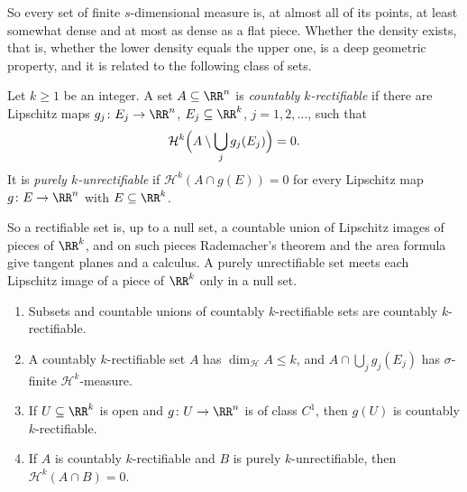 So every set of finite $s$-dimensional measure is, at almost all of its points, at least somewhat dense and at most as dense as a flat piece. Whether the density exists, that is, whether the lower
density equals the upper one, is a deep geometric property, and it is related to the following class of sets.

\begin{definition}\label{geometric-measure-theory:definition-rectifiable}
Let $k \geq 1$ be an integer. A set $A \subseteq \RR^n$ is \emph{countably $k$-rectifiable} if there are Lipschitz maps $g_j \colon E_j \to \RR^n$, $E_j \subseteq \RR^k$, $j = 1, 2, \ldots$, such that
\[
\mathcal{H}^k\Bigl(A \setminus \bigcup_jg_j(E_j)\Bigr) = 0 .
\]
It is \emph{purely $k$-unrectifiable} if $\mathcal{H}^k(A \cap g(E)) = 0$ for every Lipschitz map $g \colon E \to \RR^n$ with $E \subseteq \RR^k$.
\end{definition}

So a rectifiable set is, up to a null set, a countable union of Lipschitz images of pieces of $\RR^k$, and on such pieces Rademacher's theorem and the area formula give tangent planes and a calculus. A
purely unrectifiable set meets each Lipschitz image of a piece of $\RR^k$ only in a null set.

\begin{proposition}\label{geometric-measure-theory:proposition-rectifiable}
\begin{enumerate}
\item Subsets and countable unions of countably $k$-rectifiable sets are countably $k$-rectifiable.
\item A countably $k$-rectifiable set $A$ has $\dim_{\mathcal{H}}A \leq k$, and $A \cap \bigcup_jg_j(E_j)$ has $\sigma$-finite $\mathcal{H}^k$-measure.
\item If $U \subseteq \RR^k$ is open and $g \colon U \to \RR^n$ is of class $C^1$, then $g(U)$ is countably $k$-rectifiable.
\item If $A$ is countably $k$-rectifiable and $B$ is purely $k$-unrectifiable, then $\mathcal{H}^k(A \cap B) = 0$.
\end{enumerate}
\end{proposition}

